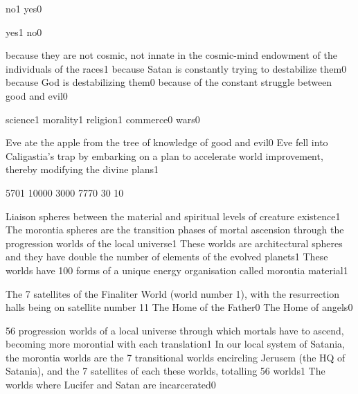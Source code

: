 {no}{1}
{yes}{0}
\qstop

{yes}{1}
{no}{0}
\qstop

{because they are not cosmic, not innate in the cosmic-mind endowment of the individuals of the races}{1}
{because Satan is constantly trying to destabilize them}{0}
{because God is destabilizing them}{0}
{because of the constant struggle between good and evil}{0}
\qstop

{science}{1}
{morality}{1}
{religion}{1}
{commerce}{0}
{wars}{0}
\qstop

{Eve ate the apple from the tree of knowledge of good and evil}{0}
{Eve fell into Caligastia's trap by embarking on a plan to accelerate world improvement, thereby modifying the divine plans}{1}
\qstop

{570}{1}
{1000}{0}
{300}{0}
{777}{0}
{3}{0}
{1}{0}
\qstop

{Liaison spheres between the material and spiritual levels of creature existence}{1}
{The morontia spheres are the transition phases of mortal ascension through the progression worlds of the local universe}{1}
{These worlds are architectural spheres and they have double the number of elements of the evolved planets}{1}
{These worlds have 100 forms of a unique energy organisation called morontia material}{1}
\qstop

{The 7 satellites of the Finaliter World (world number 1), with the resurrection halls being on satellite number 1}{1}
{The Home of the Father}{0}
{The Home of angels}{0}
\qstop

{56 progression worlds of a local universe through which mortals have to ascend, becoming more morontial with each translation}{1}
{In our local system of Satania, the morontia worlds are the 7 transitional worlds encircling Jerusem (the HQ of Satania), and the 7 satellites of each these worlds, totalling 56 worlds}{1}
{The worlds where Lucifer and Satan are incarcerated}{0}
\qstop

